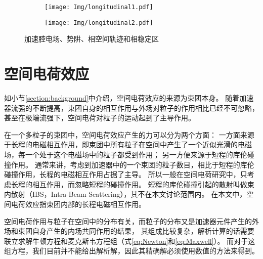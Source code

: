 \begin{figure}[!htb]
    \centering
    \begin{subfigure}[b]{0.48\textwidth}
        \texttt{[image: Img/longitudinal1.pdf]}
    \end{subfigure}
    \begin{subfigure}[b]{0.45\textwidth}
        \texttt{[image: Img/longitudinal2.pdf]}
    \end{subfigure}
    \caption{加速腔电场、势阱、相空间轨迹和相稳定区}
    \label{fig:longitudinal1}
\end{figure}


\section{空间电荷效应}
\label{section:spaceChargeIntro}
如小节\ref{section:background}中介绍，空间电荷效应的来源为束团本身。
随着加速器流强的不断提高，束团自身的相互作用与外场对粒子的作用相比已经不可忽略，
甚至在极端流强下，空间电荷对粒子的运动起到了主导作用。

在一个多粒子的束团中，空间电荷效应产生的力可以分为两个方面：
一方面来源于长程的电磁相互作用，即束团中所有粒子在空间中产生了一个近似光滑的电磁场，每一个处于这个电磁场中的粒子都受到作用；
另一方便来源于短程的库伦碰撞作用。
通常来讲，考虑到加速器中的一个束团的粒子数目，相比于短程的库伦碰撞作用，长程的电磁相互作用占据了主导。
所以一般在空间电荷研究中，只考虑长程的相互作用，而忽略短程的碰撞作用。
短程的库伦碰撞引起的散射叫做束内散射（IBS，Intra-Beam Scattering），其不在本文讨论范围内。
在本文中，空间电荷效应指束团内部的长程电磁相互作用。

空间电荷作用与粒子在空间中的分布有关，而粒子的分布又是加速器元件产生的外场和束团自身产生的内场共同作用的结果，
其组成比较复杂，解析计算的话需要联立求解牛顿方程和麦克斯韦方程组（式\ref{eq:Newton}和\ref{eq:Maxwell}）。
而对于这组方程，我们目前并不能给出解析解，因此其精确解必须使用数值的方法来得到。

